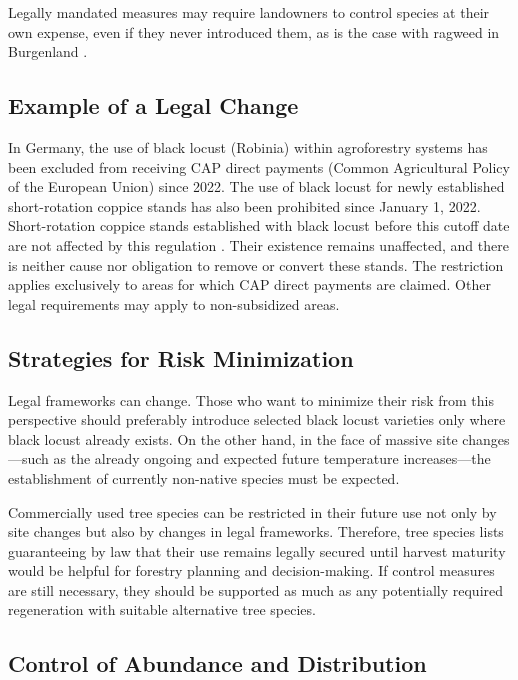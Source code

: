 Legally mandated measures may require landowners to control species at their own expense, even if they never introduced them, as is the case with ragweed in Burgenland \citep{burgenland2021ragweed}.

\subsection{Example of a Legal Change}%

In Germany, the use of black locust (Robinia) within agroforestry systems has been excluded from receiving CAP direct payments (Common Agricultural Policy of the European Union) since 2022. The use of black locust for newly established short-rotation coppice stands has also been prohibited since January 1, 2022. Short-rotation coppice stands established with black locust before this cutoff date are not affected by this regulation \citep{deLaw2022gap}. Their existence remains unaffected, and there is neither cause nor obligation to remove or convert these stands. The restriction applies exclusively to areas for which CAP direct payments are claimed. Other legal requirements may apply to non-subsidized areas.

\subsection{Strategies for Risk Minimization}

Legal frameworks can change. Those who want to minimize their risk from this perspective should preferably introduce selected black locust varieties only where black locust already exists. On the other hand, in the face of massive site changes—such as the already ongoing and expected future temperature increases—the establishment of currently non-native species must be expected.

Commercially used tree species can be restricted in their future use not only by site changes but also by changes in legal frameworks. Therefore, tree species lists guaranteeing by law that their use remains legally secured until harvest maturity would be helpful for forestry planning and decision-making. If control measures are still necessary, they should be supported as much as any potentially required regeneration with suitable alternative tree species.

\subsection{Control of Abundance and Distribution}

